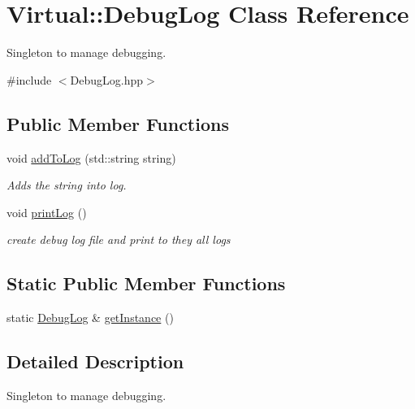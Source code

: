 \hypertarget{class_virtual_1_1_debug_log}{}\section{Virtual\+:\+:Debug\+Log Class Reference}
\label{class_virtual_1_1_debug_log}


Singleton to manage debugging.  




{\ttfamily \#include $<$Debug\+Log.\+hpp$>$}

\subsection*{Public Member Functions}
\begin{DoxyCompactItemize}
\item 
void \hyperlink{class_virtual_1_1_debug_log_af629e3c39eb80538b8b62076fb02ad4b}{add\+To\+Log} (std\+::string string)
\begin{DoxyCompactList}\small\item\em Adds the string into log. \end{DoxyCompactList}\item 
\hypertarget{class_virtual_1_1_debug_log_ab272eb11cbba0e95cb4df862667c112b}{}\label{class_virtual_1_1_debug_log_ab272eb11cbba0e95cb4df862667c112b} 
void \hyperlink{class_virtual_1_1_debug_log_ab272eb11cbba0e95cb4df862667c112b}{print\+Log} ()
\begin{DoxyCompactList}\small\item\em create debug log file and print to they all logs \end{DoxyCompactList}\end{DoxyCompactItemize}
\subsection*{Static Public Member Functions}
\begin{DoxyCompactItemize}
\item 
static \hyperlink{class_virtual_1_1_debug_log}{Debug\+Log} \& \hyperlink{class_virtual_1_1_debug_log_a7360c164a4fa8df9a68449bdf4c38ecf}{get\+Instance} ()
\end{DoxyCompactItemize}


\subsection{Detailed Description}
Singleton to manage debugging. 

